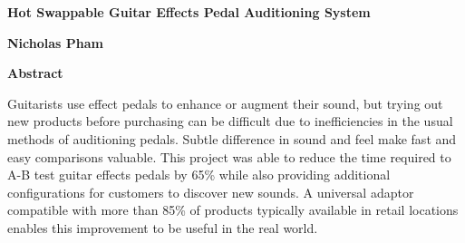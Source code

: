 \thispagestyle{plain}
\begin{center}
    \Large
    \textbf{Hot Swappable Guitar Effects Pedal Auditioning System}
    
    \vspace{0.4cm}
    \large
    \textbf{Nicholas Pham}
    
    \vspace{0.9cm}
    \textbf{Abstract}
\end{center}



Guitarists use effect pedals to enhance or augment their sound, but trying out new products before purchasing can be difficult due to inefficiencies in the usual methods of auditioning pedals. Subtle difference in sound and feel make fast and easy comparisons valuable. This project was able to reduce the time required to A-B test guitar effects pedals by 65\% while also providing additional configurations for customers to discover new sounds. A universal adaptor compatible with more than 85\% of products typically available in retail locations enables this improvement to be useful in the real world.